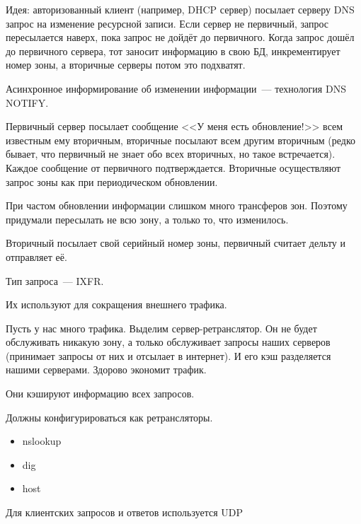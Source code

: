 Идея: авторизованный клиент (например, DHCP сервер) посылает серверу DNS запрос на изменение ресурсной записи. Если сервер не первичный, запрос пересылается наверх, пока запрос не дойдёт до первичного. Когда запрос дошёл до первичного сервера, тот заносит информацию в свою БД, инкрементирует номер зоны, а вторичные серверы потом это подхватят.


Асинхронное информирование об изменении информации~--- технология DNS NOTIFY.

Первичный сервер посылает сообщение <<У меня есть обновление!>> всем известным ему вторичным, вторичные посылают всем другим вторичным (редко бывает, что первичный не знает обо всех вторичных, но такое встречается). Каждое сообщение от первичного подтверждается. Вторичные осуществляют запрос зоны как при периодическом обновлении.


При частом обновлении информации слишком много трансферов зон. Поэтому придумали пересылать не всю зону, а только то, что изменилось.

Вторичный посылает свой серийный номер зоны, первичный считает дельту и отправляет её.

Тип запроса~--- IXFR.



Их используют для сокращения внешнего трафика.

Пусть у нас много трафика. Выделим сервер-ретранслятор. Он не будет обслуживать никакую зону, а только обслуживает запросы наших серверов (принимает запросы от них и отсылает в интернет). И его кэш разделяется нашими серверами. Здорово экономит трафик.

Они кэшируют информацию всех запросов.

Должны конфигурироваться как ретрансляторы.


\begin{itemize}
    \item nslookup
    \item dig
    \item host
\end{itemize}


Для клиентских запросов и ответов используется UDP

